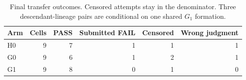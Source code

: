 \begin{table}[htbp]
\centering\small
\begin{tabular}{@{}lrrrrr@{}}
\toprule
Arm & Cells & PASS & Submitted FAIL & Censored & Wrong judgment \\
\midrule
H0 & 9 & 7 & 1 & 1 & 1 \\
G0 & 9 & 6 & 1 & 2 & 1 \\
G1 & 9 & 8 & 0 & 1 & 0 \\
\bottomrule
\end{tabular}
\caption{Final transfer outcomes. Censored attempts stay in the denominator. Three descendant-lineage pairs are conditional on one shared $G_1$ formation.}\label{tab:final}
\end{table}
